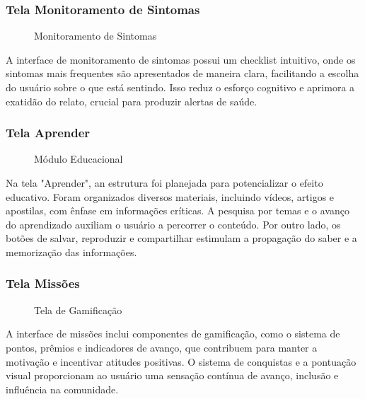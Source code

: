 \documentclass[a5paper, 12pt]{article}
\begin{document}
\subsubsection{Tela Monitoramento de Sintomas}

\begin{figure}[H]
  \centering
  \caption{Monitoramento de Sintomas}
  \label{fig:sintomas}
\end{figure}

A interface de monitoramento de sintomas possui um checklist intuitivo, onde os sintomas mais frequentes são apresentados de maneira clara, facilitando a escolha do usuário sobre o que está sentindo.  Isso reduz o esforço cognitivo e aprimora a exatidão do relato, crucial para produzir alertas de saúde.

\subsubsection{Tela Aprender}

\begin{figure}[H]
  \centering
  \caption{Módulo Educacional}
  \label{fig:educacao}
\end{figure}

Na tela "Aprender", an estrutura foi planejada para potencializar o efeito educativo.  Foram organizados diversos materiais, incluindo vídeos, artigos e apostilas, com ênfase em informações críticas.  A pesquisa por temas e o avanço do aprendizado auxiliam o usuário a percorrer o conteúdo. Por outro lado, os botões de salvar, reproduzir e compartilhar estimulam a propagação do saber e a memorização das informações.

\subsubsection{Tela Missões}

\begin{figure}[H]
  \centering
  \caption{Tela de Gamificação}
  \label{fig:missao}
\end{figure}

A interface de missões inclui componentes de gamificação, como o sistema de pontos, prêmios e indicadores de avanço, que contribuem para manter a motivação e incentivar atitudes positivas.  O sistema de conquistas e a pontuação visual proporcionam ao usuário uma sensação contínua de avanço, inclusão e influência na comunidade.
\end{document}
